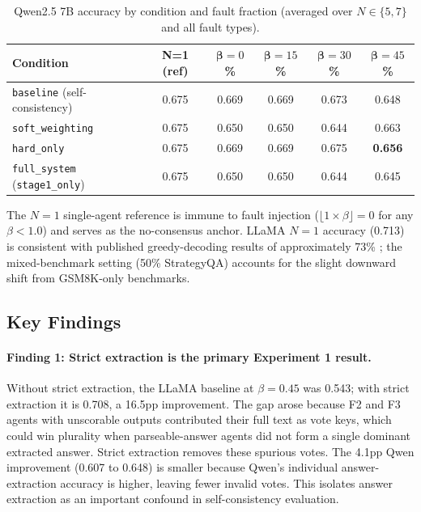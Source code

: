 \documentclass[11pt]{article}
\begin{document}
\begin{table}[h]
\centering
\caption{Qwen2.5 7B accuracy by condition and fault fraction (averaged over
  $N \in \{5,7\}$ and all fault types).}
\label{tab:exp1-qwen}
\small
\begin{tabular}{lccccc}
\toprule
\textbf{Condition} & \textbf{N=1 (ref)} & $\bm{\beta}=0$\%
  & $\bm{\beta}=15$\% & $\bm{\beta}=30$\%
  & $\bm{\beta}=45$\% \\
\midrule
\texttt{baseline} (self-consistency) & 0.675 & 0.669 & 0.669 & 0.673 & 0.648 \\
\texttt{soft\_weighting}             & 0.675 & 0.650 & 0.650 & 0.644 & 0.663 \\
\texttt{hard\_only}                  & 0.675 & 0.669 & 0.669 & 0.675 & \textbf{0.656} \\
\texttt{full\_system} (\texttt{stage1\_only}) & 0.675 & 0.650 & 0.650 & 0.644 & 0.645 \\
\bottomrule
\end{tabular}
\end{table}

The $N=1$ single-agent reference is immune to fault injection
($\lfloor 1 \times \beta \rfloor = 0$ for any $\beta < 1.0$) and serves as the
no-consensus anchor. LLaMA $N=1$ accuracy (0.713) is consistent with published
greedy-decoding results of approximately 73\% \citep{metaai2024llama}; the
mixed-benchmark setting (50\% StrategyQA) accounts for the slight downward shift
from GSM8K-only benchmarks.

\subsection{Key Findings}
\label{sec:exp1-findings}

\paragraph{Finding 1: Strict extraction is the primary Experiment 1 result.}
Without strict extraction, the LLaMA baseline at $\beta=0.45$ was 0.543; with
strict extraction it is 0.708, a 16.5pp improvement. The gap arose because F2
and F3 agents with unscorable outputs contributed their full text as vote keys,
which could win plurality when parseable-answer agents did not form a single
dominant extracted answer. Strict extraction removes these spurious votes. The
4.1pp Qwen improvement (0.607 to 0.648) is smaller because Qwen's individual
answer-extraction accuracy is higher, leaving fewer invalid votes. This isolates
answer extraction as an important confound in self-consistency evaluation.
\end{document}

